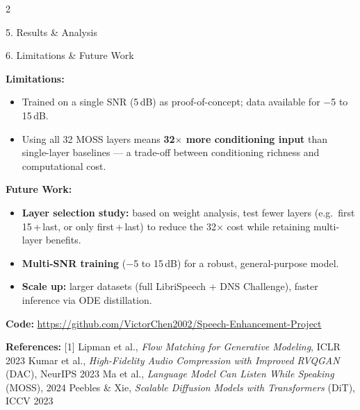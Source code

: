 \documentclass[a3paper,landscape,10pt]{article}
\begin{document}
\begin{multicols}{2}
\begin{sectionbox}{5. Results \& Analysis}
\end{sectionbox}

\vspace{-2pt}

\begin{sectionbox}{6. Limitations \& Future Work}

\textbf{Limitations:}
\begin{itemize}[leftmargin=10pt,itemsep=0pt,topsep=1pt]
  \item Trained on a single SNR (5\,dB) as proof-of-concept; data available for $-$5 to 15\,dB.
  \item Using all 32 MOSS layers means \textbf{32$\times$ more conditioning input} than single-layer baselines --- a trade-off between conditioning richness and computational cost.
\end{itemize}

\textbf{Future Work:}
\begin{itemize}[leftmargin=10pt,itemsep=0pt,topsep=1pt]
  \item \textbf{Layer selection study:} based on weight analysis, test fewer layers (e.g.\ first 15\,+\,last, or only first\,+\,last) to reduce the 32$\times$ cost while retaining multi-layer benefits.
  \item \textbf{Multi-SNR training} ($-$5 to 15\,dB) for a robust, general-purpose model.
  \item \textbf{Scale up:} larger datasets (full LibriSpeech + DNS Challenge), faster inference via ODE distillation.
\end{itemize}

\smallskip
\begin{center}
{\small\textbf{Code:} \url{https://github.com/VictorChen2002/Speech-Enhancement-Project}}
\end{center}

\vspace{-2pt}
{\scriptsize
\textbf{References:}
[1] Lipman et al., \textit{Flow Matching for Generative Modeling}, ICLR 2023 \enspace
[2] Kumar et al., \textit{High-Fidelity Audio Compression with Improved RVQGAN} (DAC), NeurIPS 2023 \enspace
[3] Ma et al., \textit{Language Model Can Listen While Speaking} (MOSS), 2024 \enspace
[4] Peebles \& Xie, \textit{Scalable Diffusion Models with Transformers} (DiT), ICCV 2023
}

\end{sectionbox}

\end{multicols}
\end{document}
